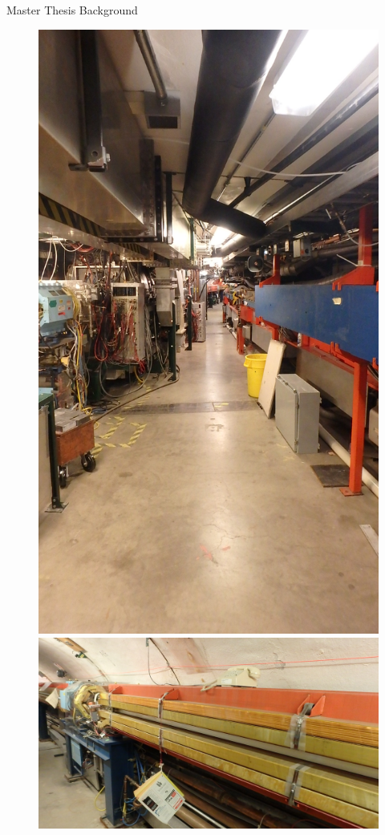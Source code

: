 \documentclass[10pt]{beamer}
\begin{document}
	\begin{frame}{Master Thesis Background}



\begin{figure}
	\begin{minipage}{0.47\textwidth}
		\includegraphics[scale=0.1,angle=-90]{chess4.JPG}
	\end{minipage}
	\begin{minipage}{0.5\textwidth}
		\includegraphics[scale=0.09]{chess5.JPG}

\end{minipage}
\end{figure}
\end{frame}
\end{document}
